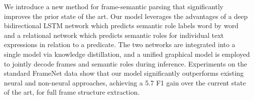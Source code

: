 We introduce a new method for frame-semantic parsing that significantly improves the prior state of the art. Our model leverages the advantages of a deep bidirectional LSTM network which predicts semantic role labels word by word and a relational network which predicts semantic roles for individual text expressions in relation to a predicate. The two networks are integrated into a single model via knowledge distillation, and a unified graphical model is employed to jointly decode frames and semantic roles during inference. Experiments on the standard FrameNet data show that our model significantly outperforms existing neural and non-neural approaches, achieving a 5.7 F1 gain over the current state of the art, for full frame structure extraction.
